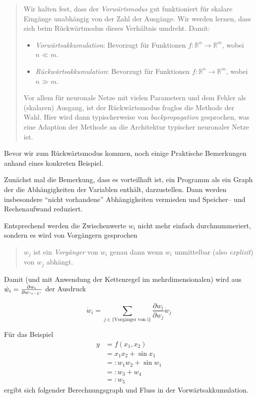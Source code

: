 \documentclass[
]{book}
\providecommand{\tightlist}{%
  \setlength{\itemsep}{0pt}\setlength{\parskip}{0pt}}
\newenvironment {JHSAYS} [0] {\begin{quote}\color{jhsc}} {\end{quote}}
\theoremstyle{definition}
\theoremstyle{definition}
\theoremstyle{definition}
\theoremstyle{definition}
\theoremstyle{remark}
\begin{document}
\leavevmode\hypertarget{fwd-ad-vs-bwd}{}%
\begin{JHSAYS}
Wir halten fest, dass der \emph{Vorwärtsmodus} gut funktioniert für skalare
Eingänge unabhängig von der Zahl der Ausgänge. Wir werden lernen,
dass sich beim Rückwärtmodus dieses Verhältnis umdreht. Damit:

\begin{itemize}
\tightlist
\item
  \emph{Vorwärtsakkumulation}: Bevorzugt für Funktionen \(f \colon \mathbb{R}^n \rightarrow \mathbb{R}^m\), wobei \(n \ll m\).
\item
  \emph{Rückwärtsakkumulation}: Bevorzugt für Funktionen \(f\colon \mathbb{R}^n \rightarrow \mathbb{R}^m\), wobei \(n \gg m\).
\end{itemize}

Vor allem für neuronale Netze mit vielen Parametern und dem Fehler als
(skalaren) Ausgang, ist der Rückwärtsmodus fraglos die Methode der
Wahl. Hier wird dann typischerweise von \emph{backpropagation} gesprochen, was eine
Adaption der Methode an die Architektur typischer neuronaler Netze ist.

\end{JHSAYS}

Bevor wir zum Rückwärtsmodus kommen, noch einige Praktische
Bemerkungen anhand eines konkreten Beispiel.

Zunächst mal die Bemerkung, dass es vorteilhaft ist, ein Programm als ein Graph der
die Abhängigkeiten der Variablen enthält, darzustellen. Dann werden
insbesondere ``nicht vorhandene'' Abhängigkeiten vermieden und Speicher-- und
Rechenaufwand reduziert.

Entsprechend werden die Zwischenwerte \(w_i\) nicht mehr einfach durchnummeriert,
sondern es wird von Vorgängern gesprochen

\begin{quote}
\(w_j\) ist ein \emph{Vorgänger} von \(w_i\) genau dann wenn \(w_i\) unmittelbar
(also \emph{explizit}) von \(w_j\) abhängt.
\end{quote}

Damit (und mit Anwendung der Kettenregel im mehrdimensionalen) wird aus
\(\dot w_i = \frac{\partial w_i}{\partial w_{"i-1"}}\) der Ausdruck

\[
\dot w_i = \sum_{j \in \{\text{Vorgänger von i}\}} \frac{\partial w_i}{\partial w_j} \dot w_j
\]

Für das Beispiel
\begin{align*}
y
&= f(x_1, x_2) \\
&= x_1 x_2 + \sin x_1 \\
&=: w_1 w_2 + \sin w_1 \\
&=: w_3 + w_4 \\
&=: w_5
\end{align*}
ergibt sich folgender Berechnungsgraph und Fluss in der
Vorwärtsakkumulation.
\end{document}
